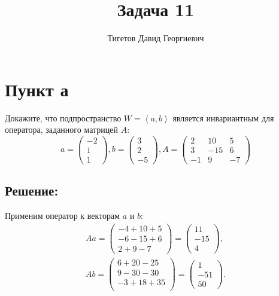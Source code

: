 \documentclass[12pt]{article}
\begin{document}
    \title{Задача 11}
    \author{Тигетов Давид Георгиевич}
    \date{}
    \maketitle

    \section*{Пункт а}
    Докажите, что подпространство $W = \left < a, b \right >$ является инвариантным для оператора, заданного матрицей $A$:
    \[
        a = \begin{pmatrix}
                -2 \\ 1 \\ 1
        \end{pmatrix},
        b = \begin{pmatrix}
                3 \\ 2 \\ -5
        \end{pmatrix},
        A = \begin{pmatrix}
                2  & 10  & 5  \\
                3  & -15 & 6  \\
                -1 & 9   & -7
        \end{pmatrix}
    \]

    \subsection*{Решение:}
    Применим оператор к векторам $a$ и $b$:
    \begin{gather*}
        A a
        =
        \begin{pmatrix}
            -4 + 10 + 5 \\
            -6 - 15 + 6 \\
            2 + 9 - 7
        \end{pmatrix}
        =
        \begin{pmatrix}
            11  \\
            -15 \\
            4
        \end{pmatrix} , \\
        A b
        =
        \begin{pmatrix}
            6 + 20 - 25   \\
            9 - 30 - 30   \\
            - 3 + 18 + 35 \\
        \end{pmatrix}
        =
        \begin{pmatrix}
            1    \\
            - 51 \\
            50
        \end{pmatrix}
        .
    \end{gather*}
\end{document}
